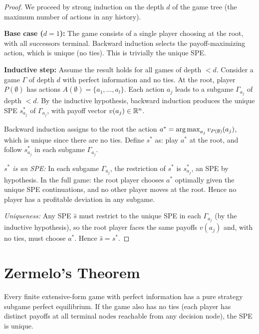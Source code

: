 \documentclass[11pt,a4paper]{article}
\begin{document}
\begin{proof}
We proceed by strong induction on the depth $d$ of the game tree (the
maximum number of actions in any history).

\textbf{Base case ($d = 1$):} The game consists of a single player choosing
at the root, with all successors terminal. Backward induction selects the
payoff-maximizing action, which is unique (no ties). This is trivially the
unique SPE.

\textbf{Inductive step:} Assume the result holds for all games of depth $< d$.
Consider a game $\Gamma$ of depth $d$ with perfect information and no ties.
At the root, player $P(\emptyset)$ has actions $A(\emptyset) = \{a_1, \ldots, a_l\}$.
Each action $a_j$ leads to a subgame $\Gamma_{a_j}$ of depth $< d$. By the
inductive hypothesis, backward induction produces the unique SPE $s^*_{a_j}$
of $\Gamma_{a_j}$, with payoff vector $v(a_j) \in \mathbb{R}^n$.

Backward induction assigns to the root the action
$a^* = \operatorname{arg\,max}_{a_j} v_{P(\emptyset)}(a_j)$, which is unique since there
are no ties. Define $s^*$ as: play $a^*$ at the root, and follow $s^*_{a_j}$
in each subgame $\Gamma_{a_j}$.

\emph{$s^*$ is an SPE:} In each subgame $\Gamma_{a_j}$, the restriction of
$s^*$ is $s^*_{a_j}$, an SPE by hypothesis. In the full game: the root
player chooses $a^*$ optimally given the unique SPE continuations, and no
other player moves at the root. Hence no player has a profitable deviation
in any subgame.

\emph{Uniqueness:} Any SPE $\hat{s}$ must restrict to the unique SPE in each
$\Gamma_{a_j}$ (by the inductive hypothesis), so the root player faces the
same payoffs $v(a_j)$ and, with no ties, must choose $a^*$. Hence
$\hat{s} = s^*$.
\end{proof}


\section{Zermelo's Theorem}
\label{sec:zermelo}

\begin{keyresult}
\begin{theorem}[Zermelo, 1913]
\label{thm:zermelo}
Every finite extensive-form game with perfect information has a pure strategy
subgame perfect equilibrium. If the game also has no ties (each player has
distinct payoffs at all terminal nodes reachable from any decision node), the
SPE is unique.
\end{theorem}
\end{keyresult}
\end{document}
